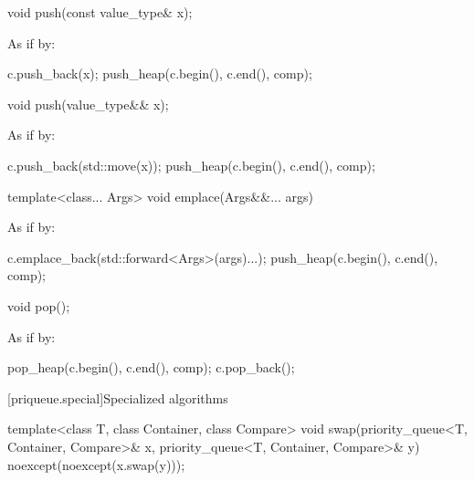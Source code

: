 \begin{codeblock}
\begin{codeblock}
%
\begin{itemdecl}
void push(const value_type& x);
\end{itemdecl}

\begin{itemdescr}
\pnum
\effects
As if by:
\begin{codeblock}
c.push_back(x);
push_heap(c.begin(), c.end(), comp);
\end{codeblock}
\end{itemdescr}

%
\begin{itemdecl}
void push(value_type&& x);
\end{itemdecl}

\begin{itemdescr}
\pnum
\effects
As if by:
\begin{codeblock}
c.push_back(std::move(x));
push_heap(c.begin(), c.end(), comp);
\end{codeblock}
\end{itemdescr}

%
\begin{itemdecl}
template<class... Args> void emplace(Args&&... args)
\end{itemdecl}

\begin{itemdescr}
\pnum
\effects
As if by:
\begin{codeblock}
c.emplace_back(std::forward<Args>(args)...);
push_heap(c.begin(), c.end(), comp);
\end{codeblock}
\end{itemdescr}


%
\begin{itemdecl}
void pop();
\end{itemdecl}

\begin{itemdescr}
\pnum
\effects
As if by:
\begin{codeblock}
pop_heap(c.begin(), c.end(), comp);
c.pop_back();
\end{codeblock}
\end{itemdescr}

[priqueue.special]{Specialized algorithms}

%
\begin{itemdecl}
template<class T, class Container, class Compare>
  void swap(priority_queue<T, Container, Compare>& x,
            priority_queue<T, Container, Compare>& y) noexcept(noexcept(x.swap(y)));
\end{itemdecl}


\end{codeblock}
\end{codeblock}
